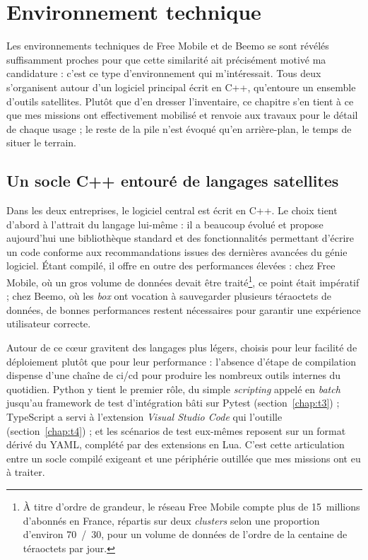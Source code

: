 \chapter{Environnement technique}
\label{chap:env}


Les environnements techniques de Free Mobile et de Beemo se sont révélés
suffisamment proches pour que cette similarité ait précisément motivé ma
candidature : c'est ce type d'environnement qui m'intéressait. Tous deux
s'organisent autour d'un logiciel principal écrit en C++, qu'entoure un
ensemble d'outils satellites. Plutôt que d'en dresser l'inventaire, ce chapitre
s'en tient à ce que mes missions ont effectivement mobilisé et renvoie aux
travaux pour le détail de chaque usage ; le reste de la pile n'est évoqué qu'en
arrière-plan, le temps de situer le terrain.

\section{Un socle C++ entouré de langages satellites}
Dans les deux entreprises, le logiciel central est écrit en C++. Le choix tient
d'abord à l'attrait du langage lui-même : il a beaucoup évolué et propose
aujourd'hui une bibliothèque standard et des fonctionnalités permettant
d'écrire un code conforme aux recommandations issues des dernières avancées du
génie logiciel. Étant compilé, il offre en outre des performances élevées :
chez Free Mobile, où un gros volume de données devait être
traité\footnote{À titre d'ordre de grandeur, le réseau Free Mobile compte
plus de 15~millions d'abonnés en France, répartis sur deux \emph{clusters}
selon une proportion d'environ 70~/~30, pour un volume de données de l'ordre
de la centaine de téraoctets par jour.}, ce point
était impératif ; chez Beemo, où les \emph{box} ont vocation à sauvegarder
plusieurs téraoctets de données, de bonnes performances restent nécessaires
pour garantir une expérience utilisateur correcte.

Autour de ce cœur gravitent des langages plus légers, choisis pour leur
facilité de déploiement plutôt que pour leur performance : l'absence d'étape de
compilation dispense d'une chaîne de \gls{ci}/\gls{cd} pour produire les
nombreux outils internes du quotidien. Python y tient le premier rôle, du
simple \emph{scripting} appelé en \emph{batch} jusqu'au framework de test
d'intégration bâti sur Pytest (section~\ref{chap:t3}) ; TypeScript a servi à
l'extension \emph{Visual Studio Code} qui l'outille (section~\ref{chap:t4}) ;
et les scénarios de test eux-mêmes reposent sur un format dérivé du YAML,
complété par des extensions en Lua. C'est cette articulation entre un socle
compilé exigeant et une périphérie outillée que mes missions ont eu à traiter.

